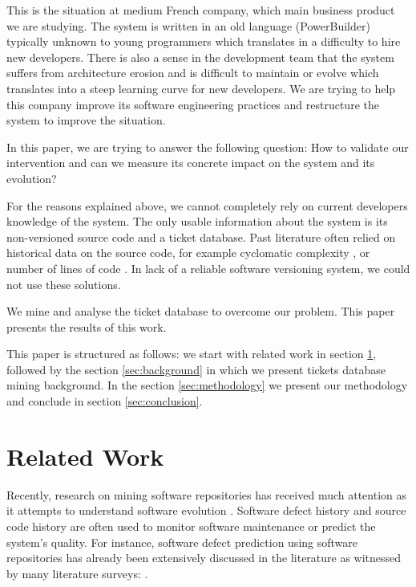 \documentclass[10pt,conference]{IEEEtran}
\begin{document}
This is the situation at medium French company, which main business product we are studying.
The system is written in an old language (PowerBuilder) typically unknown to young programmers which translates in a difficulty to hire new developers.
There is also a sense in the development team that the system suffers from architecture erosion and is difficult to maintain or evolve which translates into a steep learning curve for new developers.
We are trying to help this company improve its software engineering practices and restructure the system to improve the situation.


In this paper, we are trying to answer the following question:
How to validate our intervention and can we measure its concrete impact on the system and its evolution?

For the reasons explained above, we cannot completely rely on current developers knowledge of the system.
The only usable information about the system is its non-versioned source code and a ticket database.
Past literature often relied on historical data on the source code, for example
cyclomatic complexity \cite{gill91}, or number of lines of code \cite{port18}.
In lack of a reliable software versioning system, we could not use these solutions.


We mine and analyse the ticket database to overcome our problem.
This paper presents the results of this work.

 This paper is structured as follows: we start with related work in section \ref{sec:related-work}, followed by the section \ref{sec:background} in which we present tickets database mining background. 
 In the section \ref{sec:methodology} we present our methodology and conclude in section \ref{sec:conclusion}.
 
\section{Related Work}
\label{sec:related-work}
Recently, research on mining software repositories has received much attention as it attempts to understand software evolution \cite{Zhan10a}.
Software defect history and source code history are often used to monitor software maintenance or predict the system's quality. 
For instance, software defect prediction using software repositories has already been extensively discussed in the literature as witnessed by many literature surveys: \cite{Catal09,Hall12,Hoss17,Li19a,malh15}.
\end{document}

